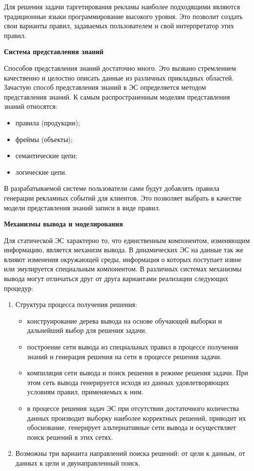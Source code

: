 Для решения задачи таргетирования рекламы наиболее подходящими являются традиционные языки программирование высокого уровня. Это позволит создать свои варианты правил, задаваемых пользователем и свой интерпретатор этих правил.

\textbf{Система представления знаний}

Способов представления знаний достаточно много. Это вызвано стремлением качественно и целостно описать данные из различных прикладных областей. Зачастую способ представления знаний в ЭС определяется методом представления знаний. К самым распространенным моделям представления знаний относятся:

\begin{itemize}
\item правила (продукции);
\item фреймы (объекты);
\item семантические цепи;
\item логические цепи.
\end{itemize}

В разрабатываемой системе пользователи сами будут добавлять правила генерации рекламных событий для клиентов. Это позволяет выбрать в качестве модели представления знаний записи в виде правил.

\textbf{Механизмы вывода и моделирования}

Для статической ЭС характерно то, что единственным компонентом, изменяющим информацию, является механизм вывода. В динамических ЭС на данные так же влияют изменения окружающей среды, информация о которых поступает извне или эмулируется специальным компонентом. В различных системах механизмы вывода могут отличаться друг от друга вариантами реализации следующих процедур:

\begin{enumerate}
	\item Структура процесса получения решения:
	\begin{itemize}
		\item конструирование дерева вывода на основе обучающей выборки и дальнейший выбор для решения задачи.
		\item построение сети вывода из специальных правил в процессе получения знаний и генерация решения на сети в процессе решения задачи.
		\item компиляция сети вывода и поиск решения в режиме решения задачи. При этом сеть вывода генерируется исходя из данных удовлетворяющих условиям правил, применяемых к ним.
		\item в процессе решения задач ЭС при отсутствии достаточного количества данных производит выборку наиболее корректных решений, приводит их обоснование, генерирует альтернативные сети вывода и осуществляет поиск решений в этих сетях.
	\end{itemize}

	\item Возможны три варианта направлений поиска решений: от цели к данным, от данных к цели и двунаправленный поиск.
\end{enumerate}

